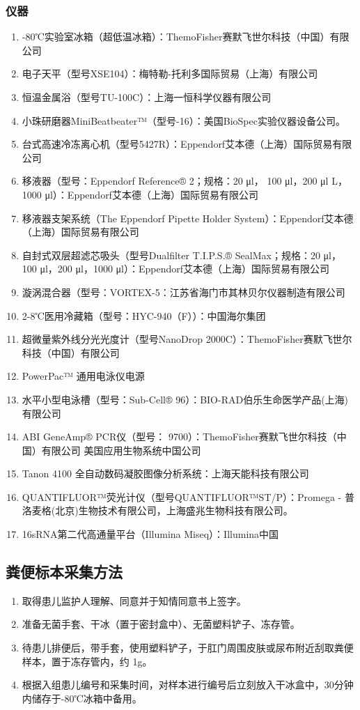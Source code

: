     \subsubsection{仪器}
    \begin{enumerate}
      \item -80℃实验室冰箱（超低温冰箱）：ThemoFisher赛默飞世尔科技（中国）有限公司
      \item 电子天平（型号XSE104）：梅特勒-托利多国际贸易（上海）有限公司
      \item 恒温金属浴（型号TU-100C）：上海一恒科学仪器有限公司
      \item 小珠研磨器MiniBeatbeater™（型号-16）：美国BioSpec实验仪器设备公司。
      \item 台式高速冷冻离心机（型号5427R）：Eppendorf艾本德（上海）国际贸易有限公司
      \item 移液器（型号：Eppendorf Reference® 2；规格：20 μl， 100 μl，200 μl L，1000 μl）：Eppendorf艾本德（上海）国际贸易有限公司
      \item 移液器支架系统（The Eppendorf Pipette Holder System）：Eppendorf艾本德（上海）国际贸易有限公司
      \item 自封式双层超滤芯吸头（型号Dualfilter T.I.P.S.® SealMax；规格：20 μl， 100 μl，200 μl，1000 μl）：Eppendorf艾本德（上海）国际贸易有限公司
      \item 漩涡混合器（型号：VORTEX-5：江苏省海门市其林贝尔仪器制造有限公司
      \item 2-8℃医用冷藏箱（型号：HYC-940（F））：中国海尔集团
      \item 超微量紫外线分光光度计（型号NanoDrop 2000C）：ThemoFisher赛默飞世尔科技（中国）有限公司
      \item PowerPac™ 通用电泳仪电源
      \item 水平小型电泳槽（型号：Sub-Cell® 96）：BIO-RAD伯乐生命医学产品(上海)有限公司
      \item ABI GeneAmp® PCR仪（型号： 9700）：ThemoFisher赛默飞世尔科技（中国）有限公司 美国应用生物系统中国公司
      \item Tanon 4100 全自动数码凝胶图像分析系统：上海天能科技有限公司
      \item QUANTIFLUOR™荧光计仪（型号QUANTIFLUOR™ST/P）：Promega - 普洛麦格(北京)生物技术有限公司，上海盛兆生物科技有限公司。
      \item 16sRNA第二代高通量平台（Illumina Miseq）：Illumina中国
    \end{enumerate}
  \subsection{粪便标本采集方法}
  \label{粪便标本采集方法}
    \begin{enumerate}
      \item 取得患儿监护人理解、同意并于知情同意书上签字。
      \item 准备无菌手套、干冰（置于密封盒中）、无菌塑料铲子、冻存管。
      \item 待患儿排便后，带手套，使用塑料铲子，于肛门周围皮肤或尿布附近刮取粪便样本，置于冻存管内，约 1g。
      \item 根据入组患儿编号和采集时间，对样本进行编号后立刻放入干冰盒中，30分钟内储存于-80℃冰箱中备用。
    \end{enumerate}

